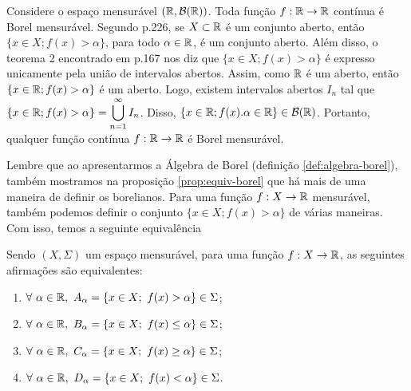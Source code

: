 \begin{example}
\label{ex:função-continua-mensuravel}
    Considere o espaço mensurável $(\mathbb{R}, \operatorname{\mathcal{B}(\mathbb{R})})$. Toda função $f: \mathbb{R} \to \mathbb{R}$ contínua é Borel mensurável.
    Segundo \supercite{elon}{p.226}, se $X \subset \mathbb{R}$ é um conjunto aberto, então $\{x \in X; f(x) > \alpha\}$, para todo $\alpha \in \mathbb{R}$, é um conjunto aberto. Além disso, o teorema 2 encontrado em \supercite{elon}{p.167} nos diz que $\{x \in X; f(x) > \alpha\}$ é expresso unicamente pela união de intervalos abertos. 
    Assim, como $\mathbb{R}$ é um aberto, então $\{x \in \mathbb{R}; f(x) > \alpha\}$ é um aberto. Logo, existem intervalos abertos $I_n$ tal que $\{x \in \mathbb{R}; f(x) > \alpha\} = \displaystyle\bigcup_{n = 1}^\infty I_n$. Disso, $\{x \in \mathbb{R}; f(x) . \alpha \in \mathbb{R}\} \in \operatorname{\mathcal{B}(\mathbb{R})}$.
    Portanto, qualquer função contínua $f: \mathbb{R} \to \mathbb{R}$ é Borel mensurável.
    \end{example}
    Lembre que ao apresentarmos a Álgebra de Borel (definição \ref{def:algebra-borel}), também mostramos na proposição \ref{prop:equiv-borel} que há mais de uma maneira de definir os borelianos.
    Para uma função $f: X \to \mathbb{R}$ mensurável, também podemos definir o conjunto $\{x \in X; f(x) > \alpha\}$ de várias maneiras.
    Com isso, temos a seguinte equivalência
    
\begin{theorem}
\label{teo:equiv-funcoes-mensuraveis}
    Sendo $(X,\Sigma)$ um espaço mensurável, para uma função $f: X \to \mathbb{R}$, as seguintes afirmações são equivalentes:
    \begin{multicols}{2}
        
    \begin{enumerate}[label=(\alph*)]
        \item $\forall \ \alpha \in \mathbb{R}, \ A_\alpha =\{x \in X;\ f(x) > \alpha \} \in \Sigma$;
        \item $\forall \ \alpha \in \mathbb{R}, \ B_\alpha =\{x \in X;\ f(x) \leq \alpha \} \in \Sigma$;
        \item $\forall \ \alpha \in \mathbb{R}, \ C_\alpha =\{x \in X;\ f(x) \geq \alpha \} \in \Sigma$;
        \item $\forall \ \alpha \in \mathbb{R}, \ D_\alpha =\{x \in X;\ f(x) < \alpha \} \in \Sigma$.
    \end{enumerate}
     \end{multicols}

\end{theorem}

